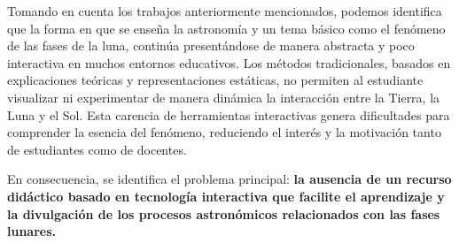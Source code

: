Tomando en cuenta los trabajos anteriormente mencionados, podemos identifica que la forma en que se enseña la astronomía y un tema básico como el fenómeno de las fases de la luna, continúa presentándose de manera abstracta y poco
interactiva en muchos entornos educativos. Los métodos tradicionales, basados en explicaciones teóricas y representaciones estáticas, no permiten al estudiante visualizar
ni experimentar de manera dinámica la interacción entre la Tierra, la Luna y el Sol. Esta carencia de herramientas interactivas genera dificultades para comprender la esencia 
del fenómeno, reduciendo el interés y la motivación tanto de estudiantes como de docentes. 

En consecuencia, se identifica el problema principal: \textbf{la ausencia de un recurso didáctico 
basado en tecnología interactiva que facilite el aprendizaje y la divulgación de los procesos astronómicos relacionados con las fases lunares.}
